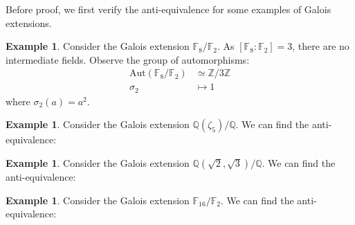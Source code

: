 \documentclass[12pt]{report}
\theoremstyle{plain}
\theoremstyle{remark}
\theoremstyle{definition}
\newtheorem{example}[theorem]{Example}
\newcommand{\Z}{\mathbb{Z}}
\newcommand{\Q}{\mathbb{Q}}
\begin{document}
Before proof, we first verify the anti-equivalence for some examples of Galois extensions.

\begin{example}
    Consider the Galois extension $\mathbb{F}_8/\mathbb{F}_2$. As $[\mathbb{F}_8:\mathbb{F}_2]=3$, there are no intermediate fields. Observe the group of automorphisms:
    \begin{align*}
        \mathrm{Aut(\mathbb{F}_8/\mathbb{F}_2)} & \simeq \Z/3\Z \\
        \sigma_2 &\mapsto 1
    \end{align*}
    where $\sigma_2(a) = a^2$.
\end{example}

\begin{example}
    Consider the Galois extension $\Q(\zeta_5)/\Q$. We can find the anti-equivalence:
    \begin{figure}[H]
        \centering
    \end{figure}
\end{example}

\begin{example}
    Consider the Galois extension $\Q(\sqrt{2},\sqrt{3})/\Q$. We can find the anti-equivalence:
    \begin{figure}[H]
        \centering
    \end{figure}
\end{example}

\begin{example}
    Consider the Galois extension $\mathbb{F}_{16}/\mathbb{F}_2$. We can find the anti-equivalence:
    \begin{figure}[H]
        \centering
    \end{figure}
\end{example}
\end{document}
